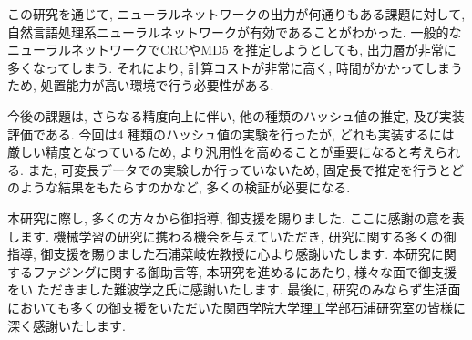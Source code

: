 \documentclass[11pt]{jbook}
\begin{document}
この研究を通じて, ニューラルネットワークの出力が何通りもある課題に対して, 自然言語処理系ニューラルネットワークが有効であることがわかった.
一般的なニューラルネットワークでCRCやMD5 を推定しようとしても, 出力層が非常に多くなってしまう.
それにより, 計算コストが非常に高く, 時間がかかってしまうため, 処置能力が高い環境で行う必要性がある.

今後の課題は, さらなる精度向上に伴い, 他の種類のハッシュ値の推定, 及び実装評価である.
今回は4 種類のハッシュ値の実験を行ったが, どれも実装するには厳しい精度となっているため, より汎用性を高めることが重要になると考えられる.
また, 可変長データでの実験しか行っていないため, 固定長で推定を行うとどのような結果をもたらすのかなど, 多くの検証が必要になる.







\acknowledgement

本研究に際し, 多くの方々から御指導, 御支援を賜りました. ここに感謝の意を表します.
機械学習の研究に携わる機会を与えていただき, 研究に関する多くの御指導, 御支援を賜りました石浦菜岐佐教授に心より感謝いたします.
本研究に関するファジングに関する御助言等, 本研究を進めるにあたり, 様々な面で御支援をい ただきました難波学之氏に感謝いたします.
最後に, 研究のみならず生活面においても多くの御支援をいただいた関西学院大学理工学部石浦研究室の皆様に深く感謝いたします.
\end{document}
